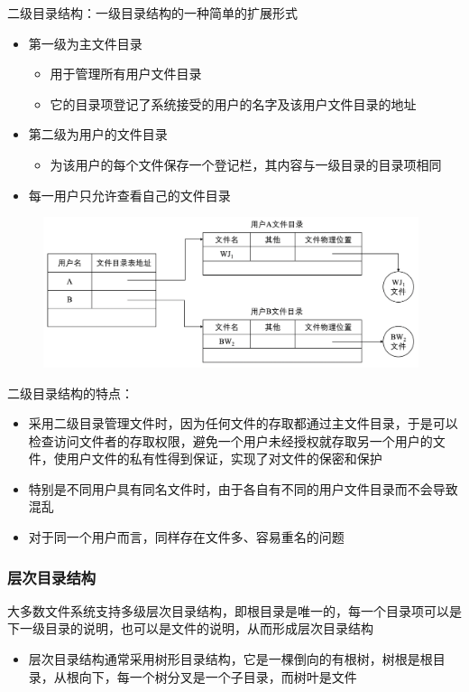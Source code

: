 \documentclass[cs4size,a4paper,10pt]{ctexart}
\begin{document}
	二级目录结构：一级目录结构的一种简单的扩展形式
	\begin{itemize}
		\item 第一级为主文件目录
		\begin{itemize}
			\item 用于管理所有用户文件目录
			\item 它的目录项登记了系统接受的用户的名字及该用户文件目录的地址
		\end{itemize}
		\item 第二级为用户的文件目录
		\begin{itemize}
			\item 为该用户的每个文件保存一个登记栏，其内容与一级目录的目录项相同
		\end{itemize}
		\item 每一用户只允许查看自己的文件目录
	\end{itemize}
	\begin{figure}[H]
		\centering
		\includegraphics[width=0.98\textwidth]{img/5.3.1.2}
	\end{figure}

	二级目录结构的特点：
	\begin{itemize}
		\item 采用二级目录管理文件时，因为任何文件的存取都通过主文件目录，于是可以检查访问文件者的存取权限，避免一个用户未经授权就存取另一个用户的文件，使用户文件的私有性得到保证，实现了对文件的保密和保护
		\item 特别是不同用户具有同名文件时，由于各自有不同的用户文件目录而不会导致混乱
		\item 对于同一个用户而言，同样存在文件多、容易重名的问题
	\end{itemize}

	\subsubsection{层次目录结构}
	大多数文件系统支持多级层次目录结构，即根目录是唯一的，每一个目录项可以是下一级目录的说明，也可以是文件的说明，从而形成层次目录结构
	\begin{itemize}
		\item 层次目录结构通常采用树形目录结构，它是一棵倒向的有根树，树根是根目录，从根向下，每一个树分叉是一个子目录，而树叶是文件
	\end{itemize}
\end{document}
